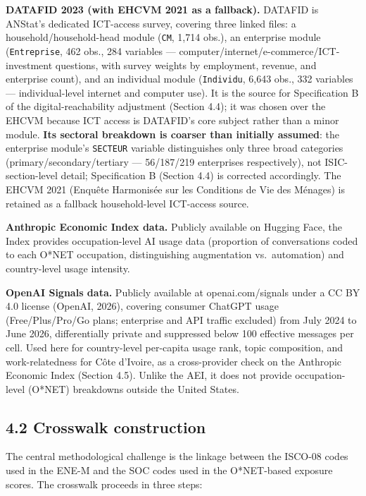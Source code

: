 \documentclass[
  11pt,
]{article}
\begin{document}
\textbf{DATAFID 2023 (with EHCVM 2021 as a fallback).} DATAFID is
ANStat's dedicated ICT-access survey, covering three linked files: a
household/household-head module (\texttt{CM}, 1,714 obs.), an enterprise
module (\texttt{Entreprise}, 462 obs., 284 variables ---
computer/internet/e-commerce/ICT-investment questions, with survey
weights by employment, revenue, and enterprise count), and an individual
module (\texttt{Individu}, 6,643 obs., 332 variables ---
individual-level internet and computer use). It is the source for
Specification B of the digital-reachability adjustment (Section 4.4); it
was chosen over the EHCVM because ICT access is DATAFID's core subject
rather than a minor module. \textbf{Its sectoral breakdown is coarser
than initially assumed}: the enterprise module's \texttt{SECTEUR}
variable distinguishes only three broad categories
(primary/secondary/tertiary --- 56/187/219 enterprises respectively),
not ISIC-section-level detail; Specification B (Section 4.4) is
corrected accordingly. The EHCVM 2021 (Enquête Harmonisée sur les
Conditions de Vie des Ménages) is retained as a fallback household-level
ICT-access source.

\textbf{Anthropic Economic Index data.} Publicly available on Hugging
Face, the Index provides occupation-level AI usage data (proportion of
conversations coded to each O*NET occupation, distinguishing
augmentation vs.~automation) and country-level usage intensity.

\textbf{OpenAI Signals data.} Publicly available at openai.com/signals
under a CC BY 4.0 license (OpenAI, 2026), covering consumer ChatGPT
usage (Free/Plus/Pro/Go plans; enterprise and API traffic excluded) from
July 2024 to June 2026, differentially private and suppressed below 100
effective messages per cell. Used here for country-level per-capita
usage rank, topic composition, and work-relatedness for Côte d'Ivoire,
as a cross-provider check on the Anthropic Economic Index (Section 4.5).
Unlike the AEI, it does not provide occupation-level (O*NET) breakdowns
outside the United States.

\subsection{4.2 Crosswalk construction}\label{crosswalk-construction}

The central methodological challenge is the linkage between the ISCO-08
codes used in the ENE-M and the SOC codes used in the O*NET-based
exposure scores. The crosswalk proceeds in three steps:
\end{document}
